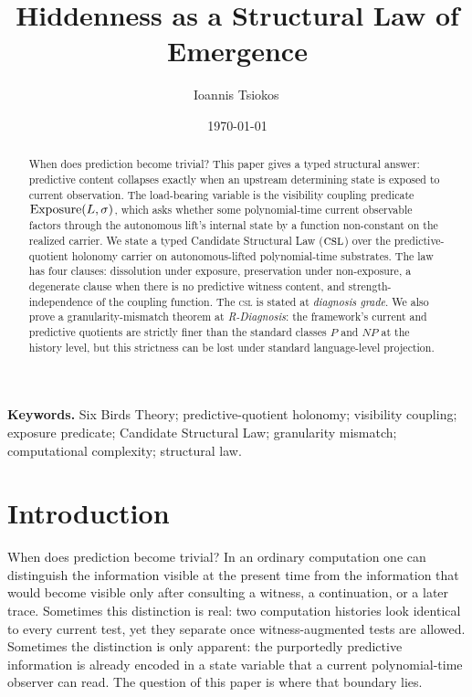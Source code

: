 \documentclass[11pt]{article}
\title{Hiddenness as a Structural Law of Emergence}
\author{Ioannis Tsiokos\,\orcidlink{0009-0009-7659-5964}}
\date{\today}
\newcommand{\CSL}{\textsc{csl}}            \newcommand{\CSLcore}{Candidate Structural Law}
\newcommand{\Substrate}{\sigma}             \newcommand{\Lift}{L}                       \newcommand{\LiftState}{\sigma_{L}}         \newcommand{\HistorySpace}{H_{\Substrate}^{\Lift}}
\newcommand{\DiagnosisGrade}{\emph{diagnosis grade}}
\newcommand{\RDiagnosis}{\emph{R-Diagnosis}}
\theoremstyle{definition}
\begin{document}
\maketitle
\thispagestyle{firstpage}

\begin{abstract}
When does prediction become trivial?  This paper gives a typed
structural answer: predictive content collapses exactly when an
upstream determining state is exposed to current observation.  The
load-bearing variable is the visibility coupling predicate
\(\Exposure(\Lift,\Substrate)\), which asks whether some polynomial-time
current observable factors through the autonomous lift's internal state
by a function non-constant on the realized carrier.  We state a typed
\CSLcore{} (\(\CSL\)) over the predictive-quotient holonomy carrier on
autonomous-lifted polynomial-time substrates.  The law has four clauses:
dissolution under exposure, preservation under non-exposure, a
degenerate clause when there is no predictive witness content, and
strength-independence of the coupling function.  The \CSL{} is stated
at \DiagnosisGrade{}.  We also prove a granularity-mismatch theorem at
\RDiagnosis{}: the framework's current and predictive quotients are
strictly finer than the standard classes \(P\) and \(NP\) at the
history level, but this strictness can be lost under standard
language-level projection.
\end{abstract}

\medskip
\noindent\textbf{Keywords.} Six Birds Theory; predictive-quotient holonomy; visibility coupling; exposure predicate; Candidate Structural Law; granularity mismatch; computational complexity; structural law.



\section{Introduction}
\label{sec:intro}

When does prediction become trivial?  In an ordinary computation one
can distinguish the information visible at the present time from the
information that would become visible only after consulting a witness,
a continuation, or a later trace.  Sometimes this distinction is real:
two computation histories look identical to every current test, yet
they separate once witness-augmented tests are allowed.  Sometimes the
distinction is only apparent: the purportedly predictive information is
already encoded in a state variable that a current polynomial-time
observer can read.  The question of this paper is where that boundary
lies.
\end{document}
